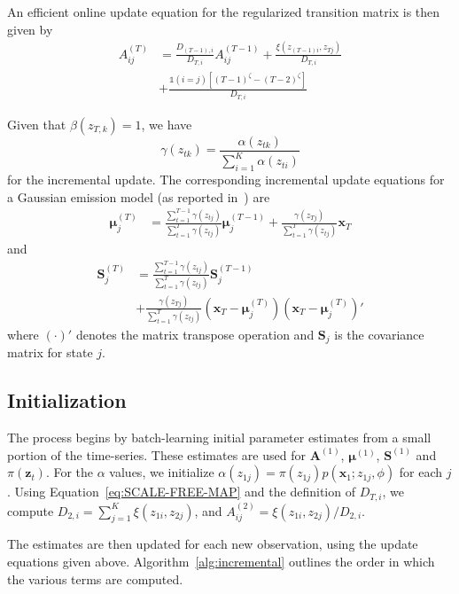 \documentclass{article}
\begin{document}
An efficient online update equation for the regularized transition matrix is then given by
\begin{align*}
    A_{ij}^{(T)} &= \frac{D_{(T-1), i}}{D_{T,i}}A_{ij}^{(T-1)}
    + \frac{\xi(z_{(T-1)i}, z_{Tj})}{D_{T,i}} \\
                 &+ \frac{\mathds{1}(i = j)[(T-1)^\zeta - (T-2)^\zeta]}{D_{T,i}}
\end{align*}

Given that $\beta(z_{T,k}) = 1$, we have 
\[
    \gamma(z_{tk}) = \frac{\alpha(z_{tk})}{\sum_{i=1}^{K}\alpha(z_{ti})}
\]
for the incremental update. The corresponding incremental update equations for a Gaussian emission model (as reported in~\cite{stenger2001}) are 
\begin{align*}
    \mathbf{\mu}_{j}^{(T)} &= \frac{\sum_{t=1}^{T-1}\gamma(z_{tj})}{\sum_{t=1}^{T}\gamma(z_{tj})}\mathbf{\mu}_{j}^{(T-1)} + \frac{\gamma(z_{Tj})}{\sum_{t=1}^{T}\gamma(z_{tj})}\mathbf{x}_T
\end{align*}
and
\begin{align*}
    \mathbf{S}_j^{(T)} &= \frac{\sum_{t=1}^{T-1}\gamma(z_{tj})}{\sum_{t=1}^{T}\gamma(z_{tj})}\mathbf{S}_j^{(T-1)} \\
                       &+ \frac{\gamma(z_{Tj})}{\sum_{t=1}^{T}\gamma(z_{tj})}\left(\mathbf{x}_T - \mathbf{\mu}_j^{(T)}\right)\left(\mathbf{x}_T - \mathbf{\mu}_j^{(T)}\right)'
\end{align*}
where $(\cdot)'$ denotes the matrix transpose operation and $\mathbf{S}_j$ is the covariance matrix for state $j$.

\subsection{Initialization}

The process begins by batch-learning initial parameter estimates from a small
portion of the time-series. These estimates are used for $\mathbf{A}^{(1)}$,
$\mathbf{\mu}^{(1)}$, $\mathbf{S}^{(1)}$ and $\pi(\mathbf{z}_t)$. For the
$\alpha$ values, we initialize $\alpha(z_{1j}) = \pi(z_{1j})p(\mathbf{x}_1;z_{1j}, 
\phi)$ for each $j$. Using Equation~\ref{eq:SCALE-FREE-MAP} and the definition
of $D_{T,i}$, we compute $D_{2,i} = \sum_{j=1}^{K} \xi(z_{1i}, z_{2j})$, and 
$A_{ij}^{(2)} = \xi(z_{1i}, z_{2j})/D_{2,i}$.

The estimates are then updated for each new observation, using the update equations given above. Algorithm~\ref{alg:incremental} outlines the order in which the various terms are computed.
\end{document}
